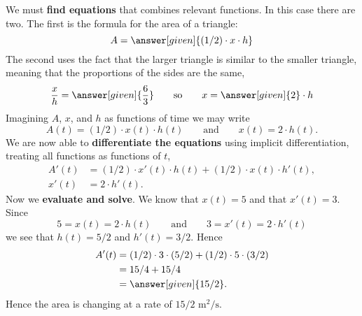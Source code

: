 \documentclass{ximera}
\begin{document}
\begin{example}
\begin{explanation}
    We must \textbf{find equations} that combines relevant
    functions. In this case there are two. The first is the formula
    for the area of a triangle:
    \[
    A = \answer[given]{(1/2) \cdot x \cdot h}
    \]
    The second uses the fact that the larger triangle is similar to
    the smaller triangle, meaning that the proportions of the sides
    are the same,
    \[
    \frac{x}{h} = \answer[given]{\frac{6}{3}}\qquad\text{so}\qquad x =
    \answer[given]{2}\cdot h
    \]
    Imagining $A$, $x$, and $h$ as functions of time we may write
    \[
    A(t) = (1/2) \cdot x(t) \cdot h(t) \qquad\text{and}\qquad x(t) =
    2\cdot h(t).
    \]
    We are now able to \textbf{differentiate the equations} using
    implicit differentiation, treating all functions as functions of
    $t$,
    \begin{align*}
      A'(t) &= (1/2) \cdot x'(t) \cdot h(t) +  (1/2) \cdot x(t) \cdot h'(t),\\
      x'(t) &= 2\cdot h'(t).
    \end{align*}
    Now we \textbf{evaluate and solve}. We
    know that $x(t) = 5$ and that $x'(t) = 3$. Since
    \[
    5=x(t) = 2\cdot h(t)\qquad\text{and}\qquad 3=x'(t)= 2\cdot h'(t)
    \]
    we see that $h(t) = 5/2$ and $h'(t) = 3/2$. Hence
    \begin{align*}
      A'(t) &= (1/2) \cdot 3 \cdot (5/2) + (1/2) \cdot 5 \cdot (3/2)\\
      &= 15/4 + 15/4\\
      &= \answer[given]{15/2}.
    \end{align*}
    Hence the area is changing at a rate of $15/2$
    $\text{m}^2/\text{s}$.
  \end{explanation}
\end{example}
\end{document}
